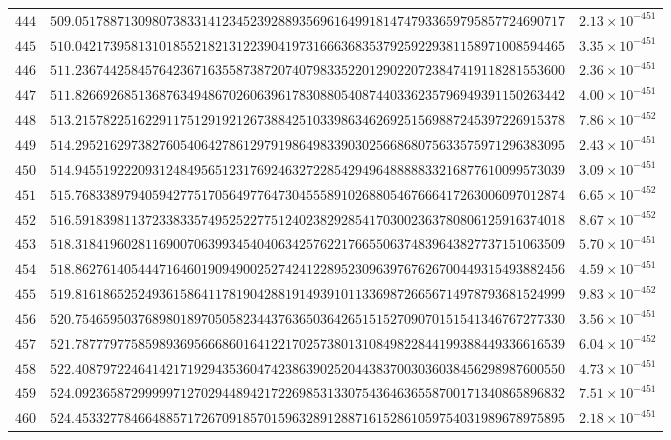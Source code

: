 \documentclass[12pt,reqno]{amsart}
\theoremstyle{remark}
\begin{document}
\begin{longtable}{clc}
$444$ & $509.0517887130980738331412345239288935696164991814747933659795857724690717$ & $2.13\times 10^{-451}$ \\
$445$ & $510.0421739581310185521821312239041973166636835379259229381158971008594465$ & $3.35\times 10^{-451}$ \\
$446$ & $511.2367442584576423671635587387207407983352201290220723847419118281553600$ & $2.36\times 10^{-451}$ \\
$447$ & $511.8266926851368763494867026063961783088054087440336235796949391150263442$ & $4.00\times 10^{-451}$ \\
$448$ & $513.2157822516229117512919212673884251033986346269251569887245397226915378$ & $7.86\times 10^{-452}$ \\
$449$ & $514.2952162973827605406427861297919864983390302566868075633575971296383095$ & $2.43\times 10^{-451}$ \\
$450$ & $514.9455192220931248495651231769246327228542949648888833216877610099573039$ & $3.09\times 10^{-451}$ \\
$451$ & $515.7683389794059427751705649776473045558910268805467666417263006097012874$ & $6.65\times 10^{-452}$ \\
$452$ & $516.5918398113723383357495252277512402382928541703002363780806125916374018$ & $8.67\times 10^{-452}$ \\
$453$ & $518.3184196028116900706399345404063425762217665506374839643827737151063509$ & $5.70\times 10^{-451}$ \\
$454$ & $518.8627614054447164601909490025274241228952309639767626700449315493882456$ & $4.59\times 10^{-451}$ \\
$455$ & $519.8161865252493615864117819042881914939101133698726656714978793681524999$ & $9.83\times 10^{-452}$ \\
$456$ & $520.7546595037689801897050582344376365036426515152709070151541346767277330$ & $3.56\times 10^{-451}$ \\
$457$ & $521.7877797758598936956668601641221702573801310849822844199388449336616539$ & $6.04\times 10^{-452}$ \\
$458$ & $522.4087972246414217192943536047423863902520443837003036038456298987600550$ & $4.73\times 10^{-451}$ \\
$459$ & $524.0923658729999971270294489421722698531330754364636558700171340865896832$ & $7.51\times 10^{-451}$ \\
$460$ & $524.4533277846648857172670918570159632891288716152861059754031989678975895$ & $2.18\times 10^{-451}$ \\

\end{longtable}
\end{document}
